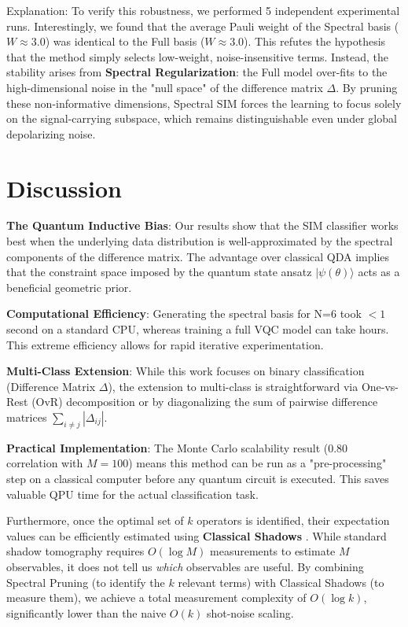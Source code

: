 \documentclass[conference]{IEEEtran}
\begin{document}
Explanation: To verify this robustness, we performed 5 independent experimental runs. Interestingly, we found that the average Pauli weight of the Spectral basis ($W \approx 3.0$) was identical to the Full basis ($W \approx 3.0$). This refutes the hypothesis that the method simply selects low-weight, noise-insensitive terms. Instead, the stability arises from \textbf{Spectral Regularization}: the Full model over-fits to the high-dimensional noise in the "null space" of the difference matrix $\Delta$. By pruning these non-informative dimensions, Spectral SIM forces the learning to focus solely on the signal-carrying subspace, which remains distinguishable even under global depolarizing noise.

\section{Discussion}
\textbf{The Quantum Inductive Bias}: Our results show that the SIM classifier works best when the underlying data distribution is well-approximated by the spectral components of the difference matrix. The advantage over classical QDA implies that the constraint space imposed by the quantum state ansatz $|\psi(\theta)\rangle$ acts as a beneficial geometric prior.

\textbf{Computational Efficiency}: Generating the spectral basis for N=6 took $<1$ second on a standard CPU, whereas training a full VQC model can take hours. This extreme efficiency allows for rapid iterative experimentation.

\textbf{Multi-Class Extension}: While this work focuses on binary classification (Difference Matrix $\Delta$), the extension to multi-class is straightforward via One-vs-Rest (OvR) decomposition or by diagonalizing the sum of pairwise difference matrices $\sum_{i \ne j} |\Delta_{ij}|$.

\textbf{Practical Implementation}: The Monte Carlo scalability result (0.80 correlation with $M=100$) means this method can be run as a "pre-processing" step on a classical computer before any quantum circuit is executed. This saves valuable QPU time for the actual classification task. 
    
    Furthermore, once the optimal set of $k$ operators is identified, their expectation values can be efficiently estimated using \textbf{Classical Shadows} \cite{huang2020predicting}. While standard shadow tomography requires $O(\log M)$ measurements to estimate $M$ observables, it does not tell us \textit{which} observables are useful. By combining Spectral Pruning (to identify the $k$ relevant terms) with Classical Shadows (to measure them), we achieve a total measurement complexity of $O(\log k)$, significantly lower than the naive $O(k)$ shot-noise scaling.
\end{document}
